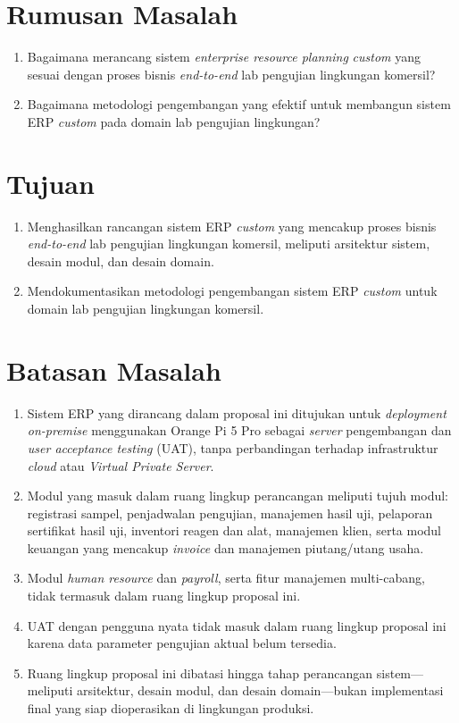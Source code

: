 \section{Rumusan Masalah}
\begin{enumerate}[1.]
    \item Bagaimana merancang sistem \textit{enterprise resource planning} \textit{custom} yang sesuai dengan proses bisnis \textit{end-to-end} lab pengujian lingkungan komersil?
    \item Bagaimana metodologi pengembangan yang efektif untuk membangun sistem ERP \textit{custom} pada domain lab pengujian lingkungan?
\end{enumerate}


\section{Tujuan}
\begin{enumerate}[1.]
    \item Menghasilkan rancangan sistem ERP \textit{custom} yang mencakup proses bisnis \textit{end-to-end} lab pengujian lingkungan komersil, meliputi arsitektur sistem, desain modul, dan desain domain.
    \item Mendokumentasikan metodologi pengembangan sistem ERP \textit{custom} untuk domain lab pengujian lingkungan komersil.
\end{enumerate}

\section{Batasan Masalah}
\begin{enumerate}[1.]
    \item Sistem ERP yang dirancang dalam proposal ini ditujukan untuk \textit{deployment} \textit{on-premise} menggunakan Orange Pi 5 Pro sebagai \textit{server} pengembangan dan \textit{user acceptance testing} (UAT), tanpa perbandingan terhadap infrastruktur \textit{cloud} atau \textit{Virtual Private Server}.
    \item Modul yang masuk dalam ruang lingkup perancangan meliputi tujuh modul: registrasi sampel, penjadwalan pengujian, manajemen hasil uji, pelaporan sertifikat hasil uji, inventori reagen dan alat, manajemen klien, serta modul keuangan yang mencakup \textit{invoice} dan manajemen piutang/utang usaha.
    \item Modul \textit{human resource} dan \textit{payroll}, serta fitur manajemen multi-cabang, tidak termasuk dalam ruang lingkup proposal ini.
    \item UAT dengan pengguna nyata tidak masuk dalam ruang lingkup proposal ini karena data parameter pengujian aktual belum tersedia.
    \item Ruang lingkup proposal ini dibatasi hingga tahap perancangan sistem—meliputi arsitektur, desain modul, dan desain domain—bukan implementasi final yang siap dioperasikan di lingkungan produksi.
\end{enumerate}

